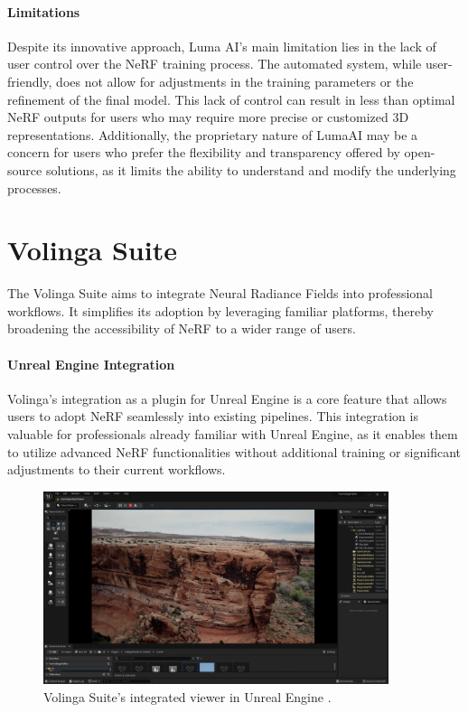 \paragraph{Limitations}
Despite its innovative approach, Luma AI's main limitation lies in the lack of user control over the NeRF training process.
The automated system, while user-friendly, does not allow for adjustments in the training parameters or the refinement of the final model.
This lack of control can result in less than optimal NeRF outputs for users who may require more precise or customized 3D representations.
Additionally, the proprietary nature of LumaAI may be a concern for users who prefer the flexibility and transparency offered by open-source solutions, as it limits the ability to understand and modify the underlying processes.

\section{Volinga Suite}

The Volinga Suite \cite{noauthor_volinga_nodate} aims to integrate Neural Radiance Fields into professional workflows.
It simplifies its adoption by leveraging familiar platforms, thereby broadening the accessibility of NeRF to a wider range of users.

\paragraph{Unreal Engine Integration}
Volinga's integration as a plugin for Unreal Engine \cite{noauthor_unreal_nodate} is a core feature that allows users to adopt NeRF seamlessly into existing pipelines.
This integration is valuable for professionals already familiar with Unreal Engine, as it enables them to utilize advanced NeRF functionalities without additional training or significant adjustments to their current workflows.

\begin{figure}[h!]
  \centering
  \includegraphics[width=0.9\textwidth]{figures/related-volinga.png}
  \caption{Volinga Suite's integrated viewer in Unreal Engine \cite{noauthor_volinga_nodate}.}
  \label{fig:volinga-viewer}
\end{figure}

